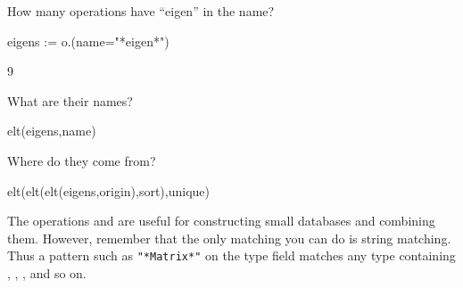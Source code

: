 {{{{{{{\begin{xtc}
\begin{xtccomment}
How many operations have ``eigen'' in the name?
\end{xtccomment}
\begin{spadsrc}
eigens := o.(name="*eigen*")
\end{spadsrc}
\begin{TeXOutput}
\begin{fricasmath}{8}
9%
\end{fricasmath}
\end{TeXOutput}
\end{xtc}
\begin{xtc}
\begin{xtccomment}
What are their names?
\end{xtccomment}
\begin{spadsrc}
elt(eigens,name)
\end{spadsrc}
\begin{TeXOutput}
\begin{fricasmath}{9}
%
\end{fricasmath}
\end{TeXOutput}
\end{xtc}
\begin{xtc}
\begin{xtccomment}
Where do they come from?
\end{xtccomment}
\begin{spadsrc}
elt(elt(elt(eigens,origin),sort),unique) 
\end{spadsrc}
\begin{TeXOutput}
\begin{fricasmath}{10}
%
\end{fricasmath}
\end{TeXOutput}
\end{xtc}

The operations \spadop{+} and \spadop{-} are useful for
constructing small databases and combining them.
However, remember that the only matching you can do is string
matching.
Thus a pattern such as {\tt "*Matrix*"} on the type field
matches
any type containing , ,
, and so on.

}}}}}}}
